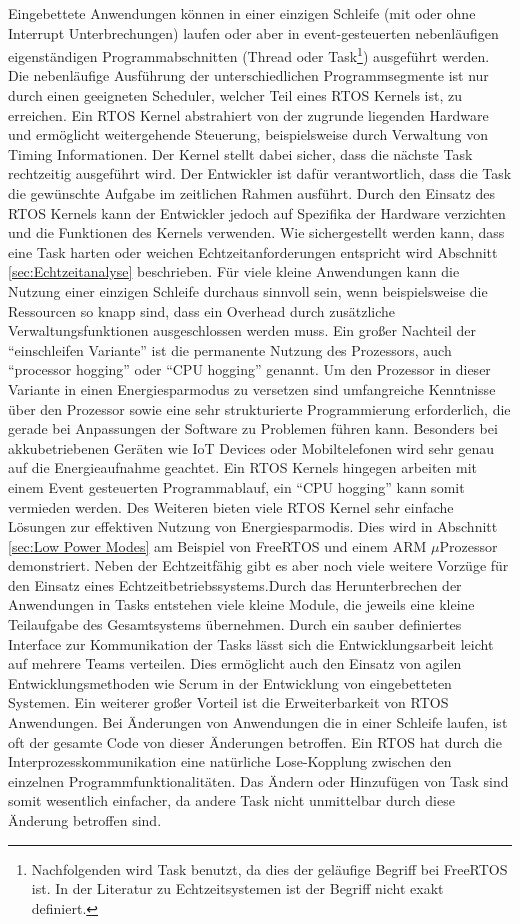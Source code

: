 Eingebettete Anwendungen können in einer einzigen Schleife (mit oder ohne Interrupt Unterbrechungen) laufen oder aber in event-gesteuerten ne\-ben\-läuf\-igen ei\-gen\-stän\-dig\-en Programmabschnitten (Thre\-ad oder Task\footnote{Nachfolgenden wird Task benutzt, da dies der geläufige Begriff bei FreeRTOS ist. In der Literatur zu Echtzeitsystemen ist der Begriff nicht exakt definiert.}) ausgeführt werden. Die nebenläufige Aus\-füh\-rung der unterschiedlichen Programmsegmente ist nur durch einen geeigneten Scheduler, welcher Teil eines RTOS Kernels ist, zu erreichen. Ein RTOS Kernel abstrahiert von der zugrunde liegenden Hardware und ermöglicht weitergehende Steuerung, beispielsweise durch Verwaltung von Timing Informationen. Der Kernel stellt dabei sicher, dass die nächste Task rechtzeitig ausgeführt wird. Der Entwickler ist dafür verantwortlich, dass die Task die ge\-wün\-schte Aufgabe im zeitlichen Rahmen ausführt. Durch den Einsatz des RTOS Kernels kann der Entwickler jedoch auf Spezifika der Hardware verzichten und die Funktionen des Kernels verwenden. Wie sichergestellt werden kann, dass eine Task  harten oder weichen Echtzeitanforderungen entspricht wird Abschnitt \ref{sec:Echtzeitanalyse} beschrieben. Für viele kleine Anwendungen kann die Nutzung einer einzigen Schleife durchaus sinnvoll sein, wenn beispielsweise die Ressourcen so knapp sind, dass ein Overhead durch zusätzliche Verwaltungsfunktionen ausgeschlossen werden muss. Ein großer Nachteil der "`einschleifen Variante"' ist die permanente Nutzung des Prozessors, auch "`processor hogging"' oder "`CPU hogging"' genannt. Um den Prozessor in dieser Variante in einen Energiesparmodus zu versetzen sind umfangreiche Kenntnisse über den Prozessor sowie eine sehr strukturierte Programmierung erforderlich, die gerade bei Anpassungen der Software zu Problemen führen kann. Besonders bei akkubetriebenen Geräten wie IoT Devices oder Mobiltelefonen wird sehr genau auf die Energieaufnahme geachtet. Ein RTOS Kernels hingegen arbeiten mit einem Event gesteuerten Programmablauf, ein "`CPU hogging"' kann somit vermieden werden. Des Weiteren bieten viele RTOS Kernel sehr einfache Lösungen zur effektiven Nutzung von Energiesparmodis. Dies wird in Abschnitt \ref{sec:Low Power Modes} am Beispiel von FreeRTOS und einem ARM $\mu$Prozessor demonstriert. Neben der Echtzeitfähig gibt es aber noch viele weitere Vorzüge für den Einsatz eines Echtzeitbetriebssystems.Durch das Herunterbrechen der Anwendungen in Tasks entstehen viele kleine Module, die jeweils eine kleine Teilaufgabe des Gesamtsystems über\-neh\-men. Durch ein sauber definiertes Interface zur Kommunikation der Tasks lässt sich die Entwicklungsarbeit leicht auf mehrere Teams verteilen. Dies ermöglicht auch den Einsatz von agilen Entwicklungsmethoden wie Scrum in der Entwicklung von eingebetteten Systemen. Ein weiterer großer Vorteil ist die Erweiterbarkeit von RTOS Anwendungen. Bei Änderungen von Anwendungen die in einer Schleife laufen, ist oft der gesamte Code von dieser Änderungen betroffen. Ein RTOS hat durch die Interprozesskommunikation eine natürliche Lose-Kopplung zwischen den einzelnen Programmfunktionalitäten. Das Ändern oder Hinzufügen von Task sind somit wesentlich einfacher, da andere Task nicht unmittelbar durch diese Änderung betroffen sind.    
